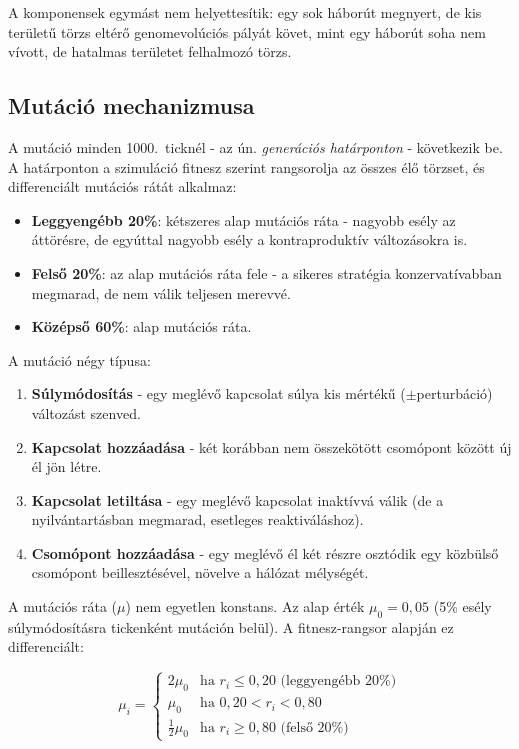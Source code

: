 ﻿\documentclass[a4paper,12pt]{report}
\begin{document}
A komponensek egymást nem helyettesítik: egy sok háborút megnyert, de kis területű
törzs eltérő genomevolúciós pályát követ, mint egy háborút soha nem vívott,
de hatalmas területet felhalmozó törzs.

\subsection*{Mutáció mechanizmusa}

A mutáció minden 1000.~ticknél - az ún. \textit{generációs határponton} - következik be.
A határponton a szimuláció fitnesz szerint rangsorolja az összes élő törzset,
és differenciált mutációs rátát alkalmaz:

\begin{itemize}
  \item \textbf{Leggyengébb 20\%}: kétszeres alap mutációs ráta - nagyobb esély
    az áttörésre, de egyúttal nagyobb esély a kontraproduktív változásokra is.
  \item \textbf{Felső 20\%}: az alap mutációs ráta fele - a sikeres stratégia
    konzervatívabban megmarad, de nem válik teljesen merevvé.
  \item \textbf{Középső 60\%}: alap mutációs ráta.
\end{itemize}

A mutáció négy típusa:
\begin{enumerate}
  \item \textbf{Súlymódosítás} - egy meglévő kapcsolat súlya kis mértékű
    ($\pm$perturbáció) változást szenved.
  \item \textbf{Kapcsolat hozzáadása} - két korábban nem összekötött csomópont
    között új él jön létre.
  \item \textbf{Kapcsolat letiltása} - egy meglévő kapcsolat inaktívvá válik
    (de a nyilvántartásban megmarad, esetleges reaktiváláshoz).
  \item \textbf{Csomópont hozzáadása} - egy meglévő él két részre osztódik
    egy közbülső csomópont beillesztésével, növelve a hálózat mélységét.
\end{enumerate}

A mutációs ráta ($\mu$) nem egyetlen konstans. Az alap érték $\mu_0 = 0{,}05$
(5\% esély súlymódosításra tickenként mutáción belül). A fitnesz-rangsor alapján
ez differenciált:

\begin{equation}
\mu_i =
\begin{cases}
2\mu_0 & \text{ha } r_i \leq 0{,}20 \text{ (leggyengébb 20\%)} \\
\mu_0  & \text{ha } 0{,}20 < r_i < 0{,}80 \\
\tfrac{1}{2}\mu_0 & \text{ha } r_i \geq 0{,}80 \text{ (felső 20\%)}
\end{cases}
\end{equation}
\end{document}

